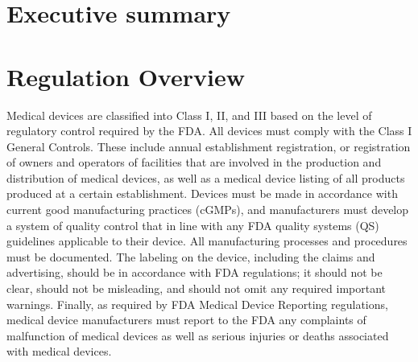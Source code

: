 \documentclass{article}
\begin{document}

\setcounter{tocdepth}{3}
\tableofcontents
\newpage

\section*{Executive summary}
\label{sec:exec-summary}

\section{Regulation Overview}
\label{sec:test-administration}

Medical devices are classified into Class I, II, and III based on the
level of regulatory control required by the FDA. All devices must
comply with the Class I General Controls. These include annual
establishment registration, or registration of owners and operators of
facilities that are involved in the production and distribution of
medical devices, as well as a medical device listing of all products
produced at a certain establishment. Devices must be made in
accordance with current good manufacturing practices (cGMPs), and
manufacturers must develop a system of quality control that in line
with any FDA quality systems (QS) guidelines applicable to their
device. All manufacturing processes and procedures must be
documented. The labeling on the device, including the claims and
advertising, should be in accordance with FDA regulations; it should
not be clear, should not be misleading, and should not omit any
required important warnings. Finally, as required by FDA Medical
Device Reporting regulations, medical device manufacturers must report
to the FDA any complaints of malfunction of medical devices as well as
serious injuries or deaths associated with medical devices.
\end{document}
